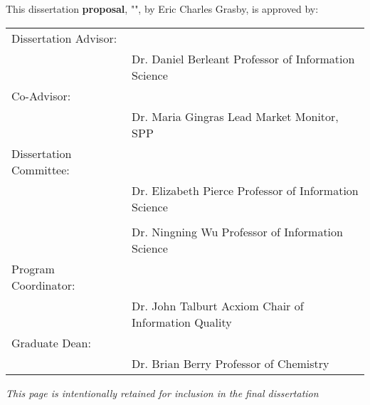 %
%
%
%  
%



\pagestyle{plain} %
\setcounter{page}{1}

\noindent This dissertation \textbf{proposal}, "\tamumanuscripttitle", by Eric Charles Grasby, is approved by:

\begin{table}[h]
    \centering
    \begin{tabularx}{\textwidth}{X X}
        \vspace{16pt}
        Dissertation Advisor: \\ & \hline \newline Dr. Daniel Berleant \newline Professor of Information Science \\
        \vspace{16pt}
        Co-Advisor: \\ & \hline \newline Dr. Maria Gingras \newline Lead Market Monitor, SPP  \\
        \vspace{16pt}
        Dissertation Committee:  \\ & \hline \newline Dr. Elizabeth Pierce \newline Professor of Information Science \\
        \vspace{16pt}
        \hfill \\ & \hline \newline Dr. Ningning Wu \newline Professor of Information Science  \\
        \vspace{16pt}
        Program Coordinator: \\ & \hline \newline Dr. John Talburt \newline Acxiom Chair of Information Quality \\
        \vspace{16pt}
        Graduate Dean: \\ & \hline \newline Dr. Brian Berry \newline Professor of Chemistry
        \vspace{1pt}
    \end{tabularx}
\end{table}

\begin{center}
    \textit{This page is intentionally retained for inclusion in the final dissertation}
\end{center}

\pagebreak{}